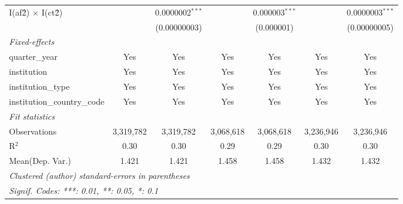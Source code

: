\begin{tabular}{lcccccc}
   I(af\^2) $\times$ I(ct\^2)         &               & 0.0000002$^{***}$ &               & 0.000003$^{***}$ &               & 0.0000003$^{***}$\\   
                                      &               & (0.00000003)      &               & (0.000001)       &               & (0.00000005)\\   
   \midrule
   \emph{Fixed-effects}\\
   quarter\_year                      & Yes           & Yes               & Yes           & Yes              & Yes           & Yes\\  
   institution                        & Yes           & Yes               & Yes           & Yes              & Yes           & Yes\\  
   institution\_type                  & Yes           & Yes               & Yes           & Yes              & Yes           & Yes\\  
   institution\_country\_code         & Yes           & Yes               & Yes           & Yes              & Yes           & Yes\\  
   \midrule
   \emph{Fit statistics}\\
   Observations                       & 3,319,782     & 3,319,782         & 3,068,618     & 3,068,618        & 3,236,946     & 3,236,946\\  
   R$^2$                              & 0.30          & 0.30              & 0.29          & 0.29             & 0.30          & 0.30\\  
Mean(Dep. Var.) & 1.421 & 1.421 & 1.458 & 1.458 & 1.432 & 1.432 \\
   \midrule \midrule
   \multicolumn{7}{l}{\emph{Clustered (author) standard-errors in parentheses}}\\
   \multicolumn{7}{l}{\emph{Signif. Codes: ***: 0.01, **: 0.05, *: 0.1}}\\
\end{tabular}
\par\endgroup
